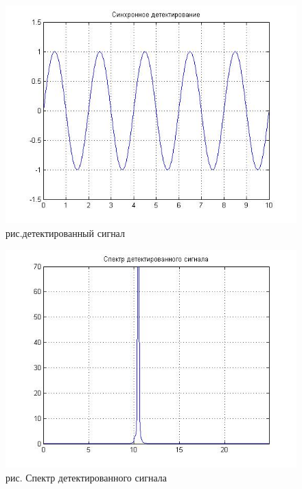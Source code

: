 \documentclass[10pt,a4paper]{report}
\begin{document}
\begin{figure}
\begin{center}
\includegraphics[angle=0, scale = 0.6]{7_9.jpg}\newline
рис.детектированный сигнал\newline
\end{center}
\end{figure}
\begin{figure}
\begin{center}
\includegraphics[angle=0, scale = 0.6]{7_10.jpg}\newline
рис. Спектр детектированного сигнала\newline
\end{center}
\end{figure}
\end{document}
